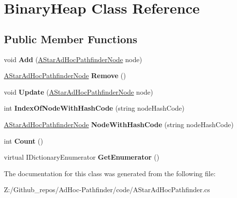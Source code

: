 \hypertarget{class_binary_heap}{\section{Binary\+Heap Class Reference}
\label{class_binary_heap}
}
\subsection*{Public Member Functions}
\begin{DoxyCompactItemize}
\item 
\hypertarget{class_binary_heap_ad1d6cdbc7082a7ec2dddb3bac6035c0c}{void {\bfseries Add} (\hyperlink{class_a_star_ad_hoc_pathfinder_node}{A\+Star\+Ad\+Hoc\+Pathfinder\+Node} node)}\label{class_binary_heap_ad1d6cdbc7082a7ec2dddb3bac6035c0c}

\item 
\hypertarget{class_binary_heap_a50f1f939f056e0cc738d42375f39ec76}{\hyperlink{class_a_star_ad_hoc_pathfinder_node}{A\+Star\+Ad\+Hoc\+Pathfinder\+Node} {\bfseries Remove} ()}\label{class_binary_heap_a50f1f939f056e0cc738d42375f39ec76}

\item 
\hypertarget{class_binary_heap_a497314219c8a3480c4367181e205acf6}{void {\bfseries Update} (\hyperlink{class_a_star_ad_hoc_pathfinder_node}{A\+Star\+Ad\+Hoc\+Pathfinder\+Node} node)}\label{class_binary_heap_a497314219c8a3480c4367181e205acf6}

\item 
\hypertarget{class_binary_heap_a0c99f3665cc24018023293dfbd20f147}{int {\bfseries Index\+Of\+Node\+With\+Hash\+Code} (string node\+Hash\+Code)}\label{class_binary_heap_a0c99f3665cc24018023293dfbd20f147}

\item 
\hypertarget{class_binary_heap_a4902196f0ec8753aedc0e73f9d8c4de4}{\hyperlink{class_a_star_ad_hoc_pathfinder_node}{A\+Star\+Ad\+Hoc\+Pathfinder\+Node} {\bfseries Node\+With\+Hash\+Code} (string node\+Hash\+Code)}\label{class_binary_heap_a4902196f0ec8753aedc0e73f9d8c4de4}

\item 
\hypertarget{class_binary_heap_abc5643e14a9ef074c1234bb2be369e88}{int {\bfseries Count} ()}\label{class_binary_heap_abc5643e14a9ef074c1234bb2be369e88}

\item 
\hypertarget{class_binary_heap_ae7f594ee113018ca8ded3947906bf0c3}{virtual I\+Dictionary\+Enumerator {\bfseries Get\+Enumerator} ()}\label{class_binary_heap_ae7f594ee113018ca8ded3947906bf0c3}

\end{DoxyCompactItemize}


The documentation for this class was generated from the following file\+:\begin{DoxyCompactItemize}
\item 
Z\+:/\+Github\+\_\+repos/\+Ad\+Hoc-\/\+Pathfinder/code/A\+Star\+Ad\+Hoc\+Pathfinder.\+cs\end{DoxyCompactItemize}
